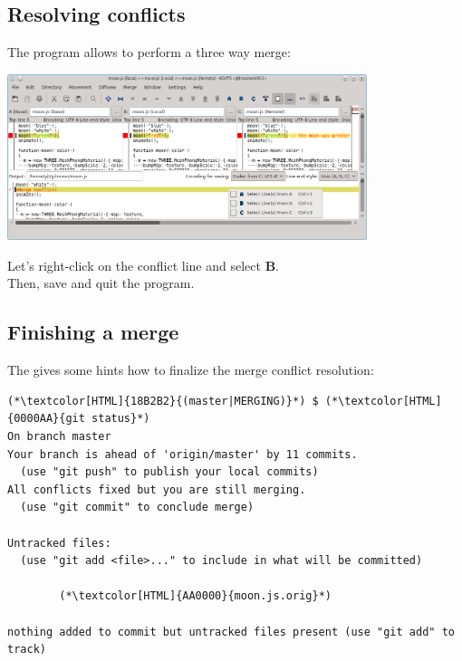 \subsection{Resolving conflicts}
\begin{frame}[fragile]
  \subslidetitle
  The program  allows to perform a three way merge:
  \\
  \vspace{1em}
  \centerline{\includegraphics[width=10.5cm]{../assets/images/kdiff3.png}}

  \vspace{1em}
  Let's right-click on the conflict line and select \textbf{B}.
  \\Then, save and quit the program.
\end{frame}

\subsection{Finishing a merge}
\begin{frame}[fragile]
  \subslidetitle
  The  gives some hints how to finalize the merge conflict resolution:
  \begin{lstlisting}
(*\textcolor[HTML]{18B2B2}{(master|MERGING)}*) $ (*\textcolor[HTML]{0000AA}{git status}*)
On branch master
Your branch is ahead of 'origin/master' by 11 commits.
  (use "git push" to publish your local commits)
All conflicts fixed but you are still merging.
  (use "git commit" to conclude merge)

Untracked files:
  (use "git add <file>..." to include in what will be committed)

        (*\textcolor[HTML]{AA0000}{moon.js.orig}*)

nothing added to commit but untracked files present (use "git add" to track)
\end{lstlisting}
\end{frame}


